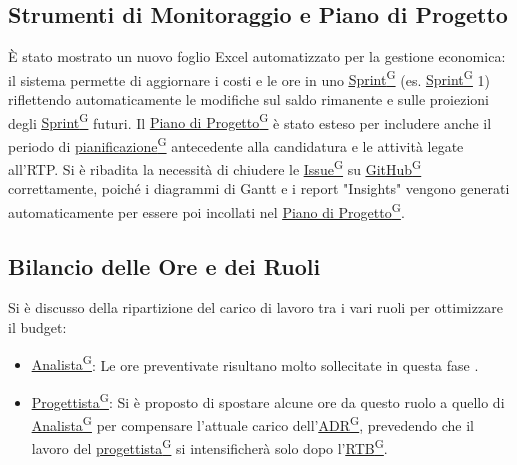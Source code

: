 \documentclass[a4paper,12pt]{article}
\providecommand{\glslink}[2]{\href{https://alittlebyte-19.github.io/Documentazione/glossario.html\#gls-#1}{\underline{#2}\textsuperscript{\scriptsize G}}}
\begin{document}
\subsection{Strumenti di Monitoraggio e Piano di Progetto}
È stato mostrato un nuovo foglio Excel automatizzato per la gestione economica: il sistema permette di aggiornare i costi e le ore in uno \glslink{sprint}{Sprint} (es. \glslink{sprint}{Sprint} 1) riflettendo automaticamente le modifiche sul saldo rimanente e sulle proiezioni degli \glslink{sprint}{Sprint} futuri. Il \glslink{piano-di-progetto}{Piano di Progetto} è stato esteso per includere anche il periodo di \glslink{pianificazione}{pianificazione} antecedente alla candidatura e le attività legate all'RTP. Si è ribadita la necessità di chiudere le \glslink{issue}{Issue} su \glslink{github}{GitHub} correttamente, poiché i diagrammi di Gantt e i report "Insights" vengono generati automaticamente per essere poi incollati nel \glslink{piano-di-progetto}{Piano di Progetto}.

\subsection{Bilancio delle Ore e dei Ruoli}
Si è discusso della ripartizione del carico di lavoro tra i vari ruoli per ottimizzare il budget:
\begin{itemize}
    \item \glslink{analista}{Analista}: Le ore preventivate risultano molto sollecitate in questa fase .
    \item \glslink{progettista}{Progettista}: Si è proposto di spostare alcune ore da questo ruolo a quello di \glslink{analista}{Analista} per compensare l'attuale carico dell'\glslink{analisi-dei-requisiti-adr}{ADR}, prevedendo che il lavoro del \glslink{progettista}{progettista} si intensificherà solo dopo l'\glslink{rtb-requirements-and-technology-baseline}{RTB}.
    \end{itemize}


\newpage
\end{document}
